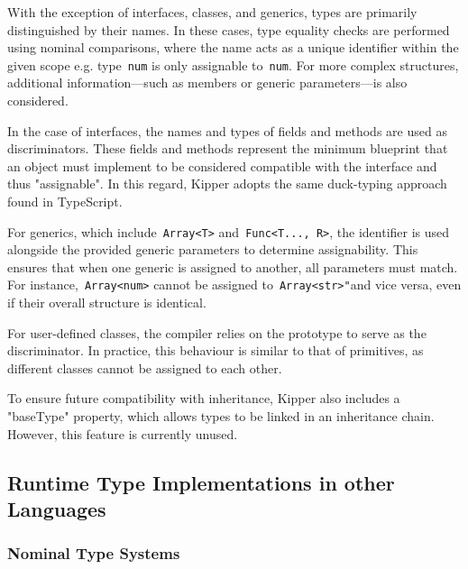 With the exception of interfaces, classes, and generics, types are primarily distinguished by their names. In these cases, type equality checks are performed using nominal comparisons, where the name acts as a unique identifier within the given scope e.g. type~\lstinline|num| is only assignable to~\lstinline|num|. For more complex structures, additional information—such as members or generic parameters—is also considered.

In the case of interfaces, the names and types of fields and methods are used as discriminators. These fields and methods represent the minimum blueprint that an object must implement to be considered compatible with the interface and thus "assignable". In this regard, Kipper adopts the same duck-typing approach found in TypeScript.

For generics, which include~\lstinline|Array<T>| and~\lstinline|Func<T..., R>|, the identifier is used alongside the provided generic parameters to determine assignability. This ensures that when one generic is assigned to another, all parameters must match. For instance,~\lstinline|Array<num>| cannot be assigned to~\lstinline|Array<str>"|and vice versa, even if their overall structure is identical.

For user-defined classes, the compiler relies on the prototype to serve as the discriminator. In practice, this behaviour is similar to that of primitives, as different classes cannot be assigned to each other.

To ensure future compatibility with inheritance, Kipper also includes a "baseType" property, which allows types to be linked in an inheritance chain. However, this feature is currently unused.

\subsection{Runtime Type Implementations in other Languages}
\label{chap:runtime-other-languages}

\subsubsection{Nominal Type Systems}

